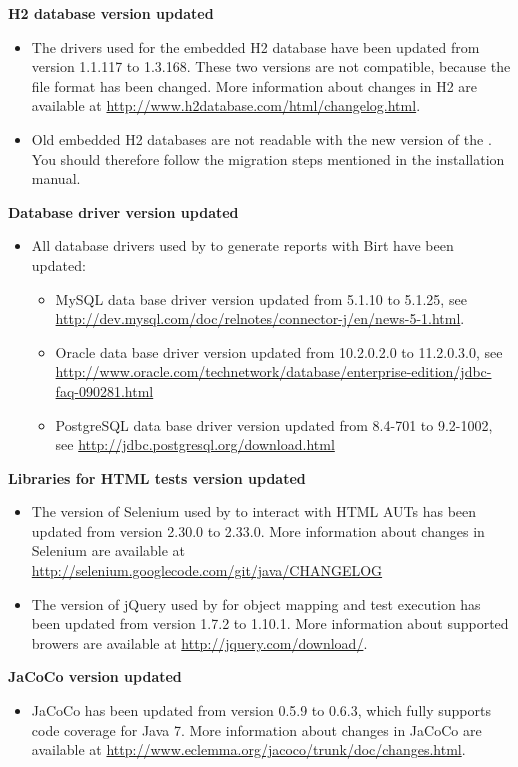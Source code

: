 \textbf{H2 database version updated}
\begin{itemize}
\item The drivers used for the embedded H2 database have been updated from version 1.1.117 to 1.3.168. These two versions are not compatible, because the file format has been changed. More information about changes in H2 are available at \url{http://www.h2database.com/html/changelog.html}.
\item Old embedded H2 databases are not readable with the new version
    of the \ite{}. You should therefore follow the migration steps mentioned in the installation manual. 
 
\end{itemize}

\textbf{Database driver version updated}
\begin{itemize}
\item All database drivers used by \ite to generate reports with Birt have been
    updated:
    \begin{itemize}
    \item MySQL data base driver version updated from 5.1.10 to 5.1.25,
        see \url{http://dev.mysql.com/doc/relnotes/connector-j/en/news-5-1.html}.
    \item Oracle data base driver version updated from 10.2.0.2.0 to 11.2.0.3.0,
        see \url{http://www.oracle.com/technetwork/database/enterprise-edition/jdbc-faq-090281.html}
    \item PostgreSQL data base driver version updated from 8.4-701 to 9.2-1002,
        see \url{http://jdbc.postgresql.org/download.html}
    \end{itemize}
\end{itemize}

\textbf{Libraries for HTML tests version updated}
\begin{itemize}
\item The version of Selenium used by \ite to interact with HTML AUTs has been
    updated from version 2.30.0 to 2.33.0. More information about changes
    in Selenium are available at
    \url{http://selenium.googlecode.com/git/java/CHANGELOG}
\item The version of jQuery used by \ite for object mapping and test execution
    has been updated from version 1.7.2 to 1.10.1. More information about
    supported browers are available at \url{http://jquery.com/download/}.
\end{itemize}

\textbf{JaCoCo version updated}
\begin{itemize}
\item JaCoCo has been updated from version 0.5.9 to 0.6.3, which fully supports
    code coverage for Java 7. More information about changes in JaCoCo are
    available at
    \url{http://www.eclemma.org/jacoco/trunk/doc/changes.html}.
\end{itemize}

